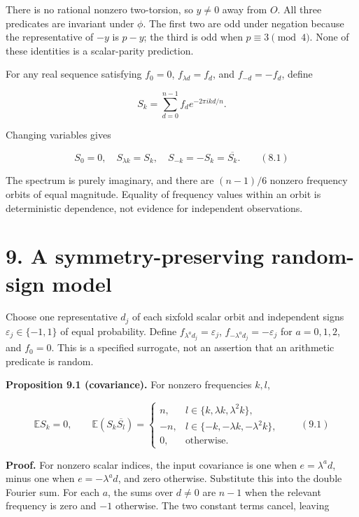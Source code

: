 \documentclass[
  11pt,
  a4paper,
]{article}
\begin{document}
There is no rational nonzero two-torsion, so \(y\neq0\) away from \(O\).
All three predicates are invariant under \(\phi\). The first two are odd
under negation because the representative of \(-y\) is \(p-y\); the
third is odd when \(p\equiv3\pmod4\). None of these identities is a
scalar-parity prediction.

For any real sequence satisfying \(f_0=0\), \(f_{\lambda d}=f_d\), and
\(f_{-d}=-f_d\), define

\[
S_k=\sum_{d=0}^{n-1}f_d e^{-2\pi i kd/n}.
\]

Changing variables gives

\[
S_0=0,\quad S_{\lambda k}=S_k,\quad
S_{-k}=-S_k=\overline{S_k}. \qquad (8.1)
\]

The spectrum is purely imaginary, and there are \((n-1)/6\) nonzero
frequency orbits of equal magnitude. Equality of frequency values within
an orbit is deterministic dependence, not evidence for independent
observations.

\section{9. A symmetry-preserving random-sign
model}\label{a-symmetry-preserving-random-sign-model}

Choose one representative \(d_j\) of each sixfold scalar orbit and
independent signs \(\varepsilon_j\in\{-1,1\}\) of equal probability.
Define \(f_{\lambda^a d_j}=\varepsilon_j\),
\(f_{-\lambda^a d_j}=-\varepsilon_j\) for \(a=0,1,2\), and \(f_0=0\).
This is a specified surrogate, not an assertion that an arithmetic
predicate is random.

\textbf{Proposition 9.1 (covariance).} For nonzero frequencies \(k,l\),

\[
\mathbb E S_k=0,\qquad
\mathbb E(S_k\overline{S_l})=
\begin{cases}
n,&l\in\{k,\lambda k,\lambda^2k\},\\
-n,&l\in\{-k,-\lambda k,-\lambda^2k\},\\
0,&\text{otherwise}.
\end{cases} \qquad (9.1)
\]

\textbf{Proof.} For nonzero scalar indices, the input covariance is one
when \(e=\lambda^a d\), minus one when \(e=-\lambda^a d\), and zero
otherwise. Substitute this into the double Fourier sum. For each \(a\),
the sums over \(d\neq0\) are \(n-1\) when the relevant frequency is zero
and \(-1\) otherwise. The two constant terms cancel, leaving
\end{document}
